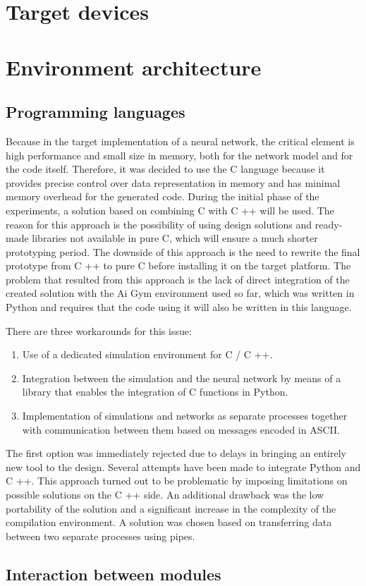 \section{Target devices}

\FloatBarrier
\section{Environment architecture}

\FloatBarrier
\subsection{Programming languages}
Because in the target implementation of a neural network, the critical element is high 
performance and small size in memory, both for the network model and for the code itself.
Therefore, it was decided to use the C language because it provides precise control over data 
representation in memory and has minimal memory overhead for the generated code. 
During the initial phase of the experiments, a solution based on combining C with C ++ will be
used. 
The reason for this approach is the possibility of using design solutions and ready-made
libraries not available in pure C, which will ensure a much shorter prototyping period. 
The downside of this approach is the need to rewrite the final prototype from C ++ to pure C 
before installing it on the target platform.
The problem that resulted from this approach is the lack of direct integration of the created
solution with the Ai Gym environment used so far, which was written in Python and requires that 
the code using it will also be written in this language.

There are three workarounds for this issue:
\begin{enumerate}
	\item Use of a dedicated simulation environment for C / C ++.
	\item Integration between the simulation and the neural network by means of a 
		  library that enables the integration of C functions in Python.
	\item Implementation of simulations and networks as separate processes together with 
		  communication between them based on messages encoded in ASCII. 
\end{enumerate}
The first option was immediately rejected due to delays in bringing an entirely new tool to 
the design.
Several attempts have been made to integrate Python and C ++.
This approach turned out to be problematic by imposing limitations on possible solutions on
the C ++ side. 
An additional drawback was the low portability of the solution and a significant increase
in the complexity of the compilation environment.
A solution was chosen based on transferring data between two separate processes using pipes.

\FloatBarrier
\subsection{Interaction between modules}


